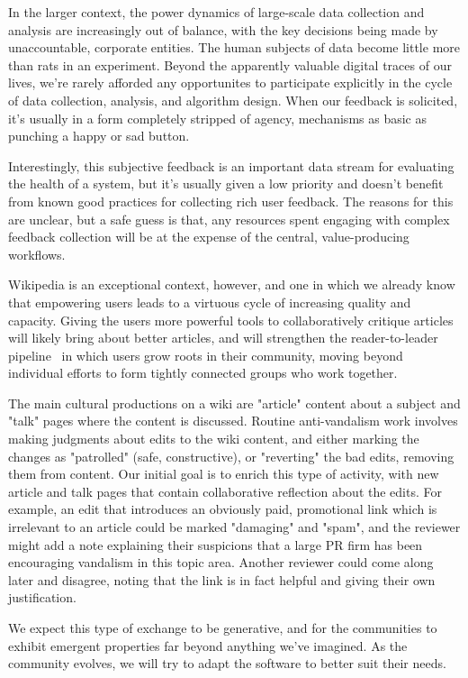 \documentclass{sigchi-ext}
\begin{document}
In the larger context, the power dynamics of large-scale data collection and analysis are increasingly out of balance, with the key decisions being made by unaccountable, corporate entities.  The human subjects of data become little more than rats in an experiment.  Beyond the apparently valuable digital traces of our lives, we're rarely afforded any opportunites to participate explicitly in the cycle of data collection, analysis, and algorithm design.  When our feedback is solicited, it's usually in a form completely stripped of agency, mechanisms as basic as punching a happy or sad button.\cite{levaniemi2012indicator}

Interestingly, this subjective feedback is an important data stream for evaluating the health of a system, but it's usually given a low priority and doesn't benefit from known good practices for collecting rich user feedback.  The reasons for this are unclear, but a safe guess is that, any resources spent engaging with complex feedback collection will be at the expense of the central, value-producing workflows.

Wikipedia is an exceptional context, however, and one in which we already know that empowering users leads to a virtuous cycle of increasing quality and capacity.  Giving the users more powerful tools to collaboratively critique articles will likely bring about better articles, and will strengthen the reader-to-leader pipeline~\cite{preece2009reader} in which users grow roots in their community, moving beyond individual efforts to form tightly connected groups who work together.

The main cultural productions on a wiki are "article" content about a subject and "talk" pages where the content is discussed.  Routine anti-vandalism work involves making judgments about edits to the wiki content, and either marking the changes as "patrolled" (safe, constructive), or "reverting" the bad edits, removing them from content.  Our initial goal is to enrich this type of activity, with new article and talk pages that contain collaborative reflection about the edits.  For example, an edit that introduces an obviously paid, promotional link which is irrelevant to an article could be marked "damaging" and "spam", and the reviewer might add a note explaining their suspicions that a large PR firm has been encouraging vandalism in this topic area.  Another reviewer could come along later and disagree, noting that the link is in fact helpful and giving their own justification.

We expect this type of exchange to be generative, and for the communities to exhibit emergent properties far beyond anything we've imagined.  As the community evolves, we will try to adapt the software to better suit their needs.
\end{document}
